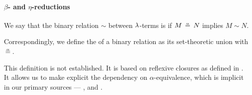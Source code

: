 \paragraph{\( \beta \)- and \( \eta \)-reductions}

\begin{definition}\label{def:alpha_reflexive}\mimprovised
  We say that the binary relation \( {\sim} \) between \( {\mathrm \lambda} \)-terms is  if \( M \aequiv N \) implies \( M \sim N \).

  Correspondingly, we define the  of a binary relation as its set-theoretic union with \( {\aequiv} \).
\end{definition}
\begin{comments}
  \item This definition is not established. It is based on reflexive closures as defined in . It allows us to make explicit the dependency on \( \alpha \)-equivalence, which is implicit in our primary sources --- \cite[ch. 3]{Barendregt1984LambdaCalculus}, \cite[def. 1B2]{Hindley1997BasicSTT} and \cite[191]{Герасимов2011Вычислимость}.
\end{comments}

